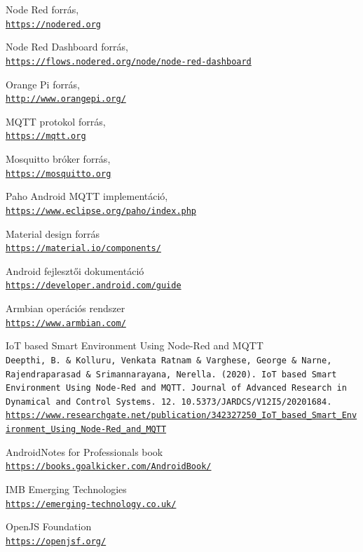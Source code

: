 \documentclass[
]{thesis-ekf}
\theoremstyle{definition}
\theoremstyle{remark}
\begin{document}
\begin{thebibliography}{2}
Node Red forrás,
\\\texttt{\url{https://nodered.org}}

Node Red Dashboard forrás,
\\\texttt{\url{https://flows.nodered.org/node/node-red-dashboard}}

Orange Pi forrás,
\\\texttt{\url{http://www.orangepi.org/}}

MQTT protokol forrás,
\\\texttt{\url{https://mqtt.org}}

Mosquitto bróker forrás,
\\\texttt{\url{https://mosquitto.org}}

Paho Android MQTT implementáció,
\\\texttt{\url{https://www.eclipse.org/paho/index.php}}

Material design forrás
\\\texttt{\url{https://material.io/components/}}

Android fejlesztői dokumentáció
\\\texttt{\url{https://developer.android.com/guide}}

Armbian operációs rendszer
\\\texttt{\url{https://www.armbian.com/}}

IoT based Smart Environment Using Node-Red and MQTT
\\\texttt{Deepthi, B. \& Kolluru, Venkata Ratnam \& Varghese, George \& Narne, Rajendraparasad \& Srimannarayana, Nerella. (2020). IoT based Smart Environment Using Node-Red and MQTT. Journal of Advanced Research in Dynamical and Control Systems. 12. 10.5373/JARDCS/V12I5/20201684.}
\\\texttt{\url{https://www.researchgate.net/publication/342327250_IoT_based_Smart_Environment_Using_Node-Red_and_MQTT}}
	
Android\texttrademark Notes for Professionals book
\\\texttt{\url{https://books.goalkicker.com/AndroidBook/}}

IMB Emerging Technologies
\\\texttt{\url{https://emerging-technology.co.uk/}}

OpenJS Foundation
\\\texttt{\url{https://openjsf.org/}}

\end{thebibliography}
%
\end{document}
